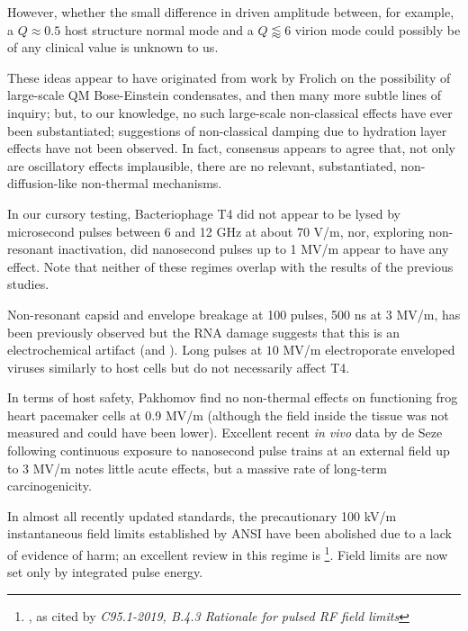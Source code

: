 \documentclass[paper.tex]{subfiles}
\begin{document}
However, whether the small difference in driven amplitude between, for example, a $Q\approx0.5$ host structure normal mode and a $Q\lessapprox6$ virion mode could possibly be of any clinical value is unknown to us. 

These ideas appear to have originated from work by Frolich on the possibility of large-scale QM Bose-Einstein condensates, and then many more subtle lines of inquiry\cite{Mechanisms1992}\cite{mechanisms1981}; but, to our knowledge, no such large-scale non-classical effects have ever been substantiated; suggestions of non-classical damping due to hydration layer effects have not been observed. In fact, consensus\cite{Exposure2009}\cite{ICNIRP2020}\cite{C95} appears to agree that, not only are oscillatory effects implausible, there are no relevant, substantiated, non-diffusion-like non-thermal mechanisms. 


In our cursory testing, Bacteriophage T4 did not appear to be lysed by microsecond pulses between 6 and 12 GHz at about 70 V/m, nor, exploring non-resonant inactivation, did nanosecond pulses up to 1 MV/m appear to have any effect. Note that neither of these regimes overlap with the results of the previous studies.

 Non-resonant capsid and envelope breakage at 100 pulses, 500 ns at 3 MV/m, has been previously observed\cite{Inactivation1990} but the RNA damage suggests that this is an electrochemical artifact \cite{Formation1996} (and \cite{Microwave1987}). Long pulses at $10$ MV/m electroporate enveloped viruses similarly to host cells\cite{AC2017} but do not necessarily affect T4\cite{Manipulation2013}. 

In terms of host safety, Pakhomov \cite{Comparative} find no non-thermal effects on functioning frog heart pacemaker cells at 0.9 MV/m (although the field inside the tissue was not measured and could have been lower). Excellent recent \textit{in vivo} data by de Seze following continuous exposure to nanosecond pulse trains at an external field up to 3 MV/m \cite{Repeated2020} notes little acute effects, but a massive rate of long-term carcinogenicity.

In almost all recently updated standards, the precautionary 100 kV/m instantaneous field limits established by ANSI have been abolished due to a lack of evidence of harm; an excellent review in this regime is \footnote{\cite{treatyelectromagnetic}, as cited by \textit{C95.1-2019, B.4.3 Rationale for pulsed RF field limits}}. Field limits are now set only by integrated pulse energy.
\end{document}
